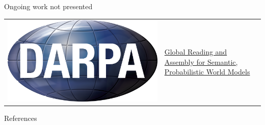 \documentclass[14pt]{beamer}
\begin{document}
\begin{frame}{Ongoing work not presented}
\begin{tabular}{ @{} c p{} @{}}
\includegraphics[trim=60 40 60 60, clip, height=.06\textheight, valign=t]{darpa.png}
&
\href{https://www.darpa.mil/program/world-modelers}{Global Reading and Assembly for Semantic, Probabilistic World Models}
\end{tabular}
\end{frame}




\appendix

\begin{frame}[allowframebreaks]{References}
\scriptsize


\end{frame}
\end{document}
